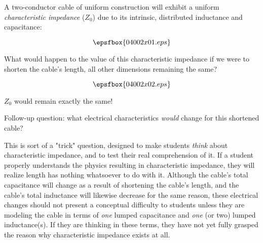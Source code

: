 

A two-conductor cable of uniform construction will exhibit a uniform {\it characteristic impedance} ($Z_0$) due to its intrinsic, distributed inductance and capacitance:

$$\epsfbox{04002x01.eps}$$

What would happen to the value of this characteristic impedance if we were to shorten the cable's length, all other dimensions remaining the same?

$$\epsfbox{04002x02.eps}$$







$Z_0$ would remain exactly the same!

\vskip 10pt

Follow-up question: what electrical characteristics {\it would} change for this shortened cable?







This is sort of a "trick" question, designed to make students {\it think} about characteristic impedance, and to test their real comprehension of it.  If a student properly understands the physics resulting in characteristic impedance, they will realize length has nothing whatsoever to do with it.  Although the cable's total capacitance will change as a result of shortening the cable's length, and the cable's total inductance will likewise decrease for the same reason, these electrical changes should not present a conceptual difficulty to students unless they are modeling the cable in terms of {\it one} lumped capacitance and {\it one} (or two) lumped inductance(s).  If they are thinking in these terms, they have not yet fully grasped the reason why characteristic impedance exists at all.




